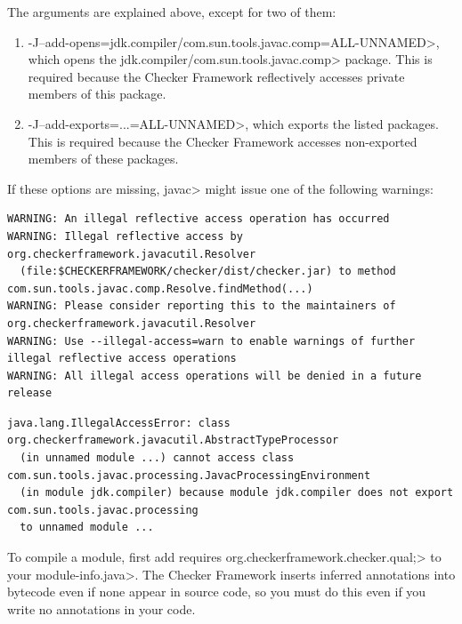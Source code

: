 The arguments are explained above, except for two of them:
\begin{enumerate}

\item \<-J--add-opens=jdk.compiler/com.sun.tools.javac.comp=ALL-UNNAMED>, which
opens the \<jdk.compiler/com.sun.tools.javac.comp> package.  This is
required because the Checker Framework reflectively accesses private members of this package.

\item \<-J--add-exports=...=ALL-UNNAMED>, which exports the listed packages.  This is
required because the Checker Framework accesses non-exported members of these packages.

\end{enumerate}

If these options are missing, \<javac> might issue one of the following warnings:
\begin{Verbatim}
WARNING: An illegal reflective access operation has occurred
WARNING: Illegal reflective access by org.checkerframework.javacutil.Resolver
  (file:$CHECKERFRAMEWORK/checker/dist/checker.jar) to method com.sun.tools.javac.comp.Resolve.findMethod(...)
WARNING: Please consider reporting this to the maintainers of org.checkerframework.javacutil.Resolver
WARNING: Use --illegal-access=warn to enable warnings of further illegal reflective access operations
WARNING: All illegal access operations will be denied in a future release
\end{Verbatim}

\begin{Verbatim}
java.lang.IllegalAccessError: class org.checkerframework.javacutil.AbstractTypeProcessor
  (in unnamed module ...) cannot access class com.sun.tools.javac.processing.JavacProcessingEnvironment
  (in module jdk.compiler) because module jdk.compiler does not export com.sun.tools.javac.processing
  to unnamed module ...
\end{Verbatim}



To compile a module, first add \<requires
org.checkerframework.checker.qual;> to your \<module-info.java>.  The Checker
Framework inserts inferred annotations into bytecode even if none appear in source code,
so you must do this even if you write no annotations in your code.

